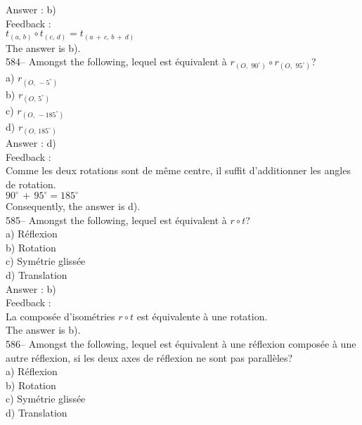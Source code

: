 ﻿\documentclass[letterpaper, 12pt]{article}
\begin{document}
Answer : b)\\

Feedback : \\
$t_{\left(a,\,b\right)} \circ t_{\left(c,\,d\right)
}=t_{\left(a\,+\,c,\,b\,+\,d\right) }$\\
The answer is b).\\

584-- Amongst the following, lequel est \'equivalent \`a
$r_{\left( O,\,\,90^{\circ}\right)} \circ r_{\left( O,\,\,95^{\circ}\right)
}$?\\
a) $r_{\left(O,\,-5^{\circ}\right) }$\\
b) $r_{\left(O,\,5^{\circ}\right) }$\\
c) $r_{\left(O,\,-185^{\circ}\right) }$\\
d) $r_{\left(O,\,185^{\circ}\right) }$\\

Answer : d)\\

Feedback : \\
Comme les deux rotations sont de m\^eme centre, il suffit d'additionner les
angles de rotation.\\
$90^{\circ}\,+\,95^{\circ}=185^{\circ}$\\
Consequently, the answer is d).\\

585-- Amongst the following, lequel est \'equivalent \`a $r\circ
t$?\\
a) R\'eflexion\\
b) Rotation\\
c) Sym\'etrie gliss\'ee\\
d) Translation\\

Answer : b) \\

Feedback : \\
La compos\'ee d'isom\'etries $r\circ t$ est \'equivalente \`a une
rotation.\\
The answer is b).\\

586-- Amongst the following, lequel est \'equivalent \`a une
r\'eflexion compos\'ee \`a une autre r\'eflexion, si les deux axes de
r\'eflexion ne sont pas parall\`eles?\\
a) R\'eflexion\\
b) Rotation\\
c) Sym\'etrie gliss\'ee\\
d) Translation\\
\end{document}
